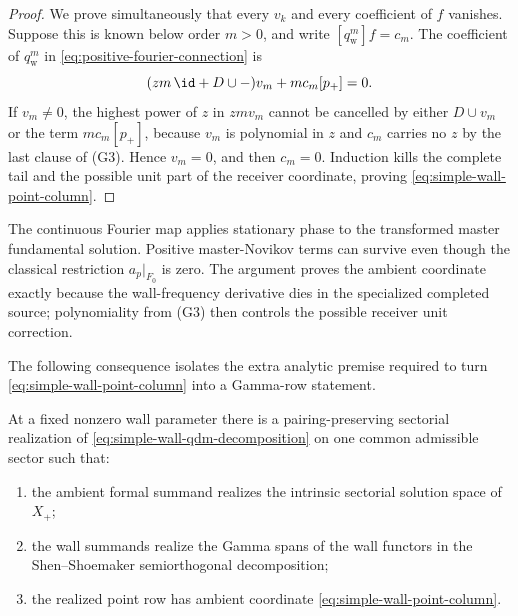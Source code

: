 \begin{proof}
We prove simultaneously that every \(v_k\) and every coefficient of \(f\)
vanishes.  Suppose this is known below order \(m>0\), and write
\([q_{\mathrm w}^m]f=c_m\).  The coefficient of \(q_{\mathrm w}^m\) in
\eqref{eq:positive-fourier-connection} is
\begin{equation}\label{eq:first-point-tail-coefficient}
 (zm\,\id+D\cup-)v_m+mc_m[p_+]=0.
\end{equation}
If \(v_m\ne0\), the highest power of \(z\) in \(zmv_m\) cannot be cancelled
by either \(D\cup v_m\) or the term \(mc_m[p_+]\), because \(v_m\)
is polynomial in \(z\) and \(c_m\) carries no \(z\) by the last clause of
\textup{(G3)}.  Hence \(v_m=0\), and then \(c_m=0\).  Induction
kills the complete tail and the possible unit part of the receiver
coordinate, proving \eqref{eq:simple-wall-point-column}.
\end{proof}

\begin{warning}\label{warn:center-coordinates}
The continuous Fourier map applies
stationary phase to the transformed master fundamental solution.  Positive
master-Novikov terms can survive even though the classical restriction
\(a_p|_{F_0}\) is zero.  The argument proves the ambient coordinate exactly
because the wall-frequency derivative dies in the specialized completed
source; polynomiality from \textup{(G3)} then controls the possible receiver
unit correction.
\end{warning}

The following consequence isolates the extra analytic premise required to
turn \eqref{eq:simple-wall-point-column} into a Gamma-row statement.

\begin{hypothesis}
\label{hyp:one-wall-sectorial}
At a fixed nonzero wall parameter there is a pairing-preserving sectorial
realization of \eqref{eq:simple-wall-qdm-decomposition} on one common
admissible sector such that:
\begin{enumerate}[label=\textup{(\alph*)}]
\item the ambient formal summand realizes the intrinsic sectorial solution
  space of \(X_+\);
\item the wall summands realize the Gamma spans of the wall functors in the
  Shen--Shoemaker semiorthogonal decomposition;
\item the realized point row has ambient coordinate
  \eqref{eq:simple-wall-point-column}.
\end{enumerate}
\end{hypothesis}

